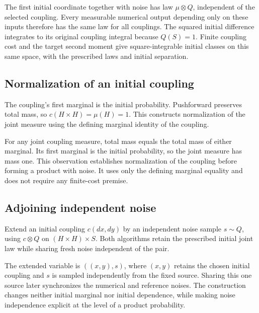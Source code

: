\documentclass[11pt,a4paper]{report}
\begin{document}
The first initial coordinate together with noise has law \(\mu\otimes Q\), independent of the selected coupling. Every measurable numerical output depending only on these inputs therefore has the same law for all couplings. The squared initial difference integrates to its original coupling integral because \(Q(S)=1\). Finite coupling cost and the target second moment give square-integrable initial classes on this same space, with the prescribed laws and initial separation.

\subsection{\texorpdfstring{Normalization of an initial coupling}{Normalization of an initial coupling}}
\label{report-step-UnadjustedLangevin-InitialExtension-lean-1}


The coupling's first marginal is the initial probability. Pushforward preserves total mass, so \(c(H\times H)=\mu(H)=1\). This constructs normalization of the joint measure using the defining marginal identity of the coupling.



For any joint coupling measure, total mass equals the total mass of either marginal. Its first marginal is the initial probability, so the joint measure has mass one. This observation establishes normalization of the coupling before forming a product with noise. It uses only the defining marginal equality and does not require any finite-cost premise.

\subsection{\texorpdfstring{Adjoining independent noise}{Adjoining independent noise}}
\label{report-step-UnadjustedLangevin-InitialExtension-lean-2}


Extend an initial coupling \(c(dx,dy)\) by an independent noise sample \(s\sim Q\), using \(c\otimes Q\) on \((H\times H)\times S\). Both algorithms retain the prescribed initial joint law while sharing fresh noise independent of the pair.



The extended variable is \(((x,y),s)\), where \((x,y)\) retains the chosen initial coupling and \(s\) is sampled independently from the fixed source. Sharing this one source later synchronizes the numerical and reference noises. The construction changes neither initial marginal nor initial dependence, while making noise independence explicit at the level of a product probability.
\end{document}
